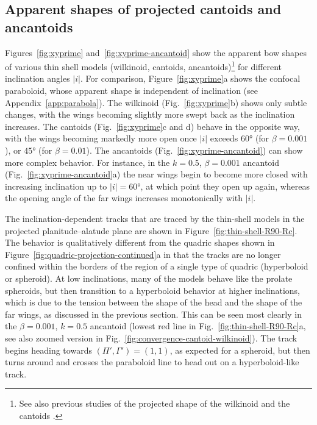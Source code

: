 \documentclass[useAMS, usenatbib, a4paper]{mnras}
\providecommand{\abs}[1]{\lvert#1\rvert}
\begin{document}
\subsection{Apparent shapes of projected cantoids and ancantoids}
\label{sec:proj-shap-cant}

Figures~\ref{fig:xyprime} and~\ref{fig:xyprime-ancantoid} show the
apparent bow shapes of various thin shell models (wilkinoid, cantoids,
ancantoids)\footnote{%
  See also previous studies of the projected shape of the wilkinoid
  \citep{Wilkin:1997a, Cox:2012a, Ng:2017a} and the cantoids
  \citep{Robberto:2005a}.} %
for different inclination angles \(\abs{i}\).  For comparison,
Figure~\ref{fig:xyprime}a shows the confocal paraboloid, whose
apparent shape is independent of inclination (see
Appendix~\ref{app:parabola}).  The wilkinoid (Fig.~\ref{fig:xyprime}b)
shows only subtle changes, with the wings becoming slightly more swept
back as the inclination increases.  The cantoids
(Fig.~\ref{fig:xyprime}c and d) behave in the opposite way, with the
wings becoming markedly more open once \(\abs{i}\) exceeds
\(\ang{60}\) (for \(\beta = 0.001\)), or \(\ang{45}\) (for
\(\beta = 0.01\)).  The ancantoids (Fig.~\ref{fig:xyprime-ancantoid}) can
show more complex behavior.  For instance, in the \(k = 0.5\),
\(\beta = 0.001\) ancantoid (Fig.~\ref{fig:xyprime-ancantoid}a) the near
wings begin to become more closed with increasing inclination up to
\(\abs{i} = \ang{60}\), at which point they open up again, whereas the
opening angle of the far wings increases monotonically with
\(\abs{i}\).

The inclination-dependent tracks that are traced by the thin-shell
models in the projected planitude--alatude plane are shown in
Figure~\ref{fig:thin-shell-R90-Rc}.  The behavior is qualitatively
different from the quadric shapes shown in
Figure~\ref{fig:quadric-projection-continued}a in that the tracks are
no longer confined within the borders of the region of a single type
of quadric (hyperboloid or spheroid). At low inclinations, many of the
models behave like the prolate spheroids, but then transition to a
hyperboloid behavior at higher inclinations, which is due to the
tension between the shape of the head and the shape of the far wings,
as discussed in the previous section. This can be seen most clearly in
the \(\beta = 0.001\), \(k = 0.5\) ancantoid (lowest red line in
Fig.~\ref{fig:thin-shell-R90-Rc}a, see also zoomed version in
Fig.~\ref{fig:convergence-cantoid-wilkinoid}). The track begins
heading towards \((\Pi', \Gamma') = (1, 1)\), as expected for a spheroid, but
then turns around and crosses the paraboloid line to head out on a
hyperboloid-like track.
\end{document}
